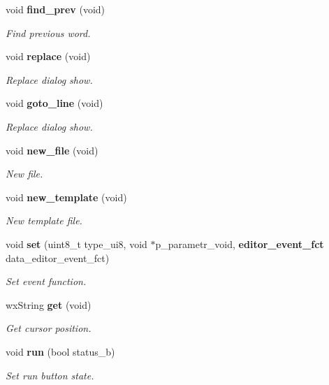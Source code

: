 \begin{DoxyCompactItemize}
void \textbf{ find\+\_\+prev} (void)
\begin{DoxyCompactList}\small\item\em Find previous word. \end{DoxyCompactList}\item 
void \textbf{ replace} (void)
\begin{DoxyCompactList}\small\item\em Replace dialog show. \end{DoxyCompactList}\item 
void \textbf{ goto\+\_\+line} (void)
\begin{DoxyCompactList}\small\item\em Replace dialog show. \end{DoxyCompactList}\item 
void \textbf{ new\+\_\+file} (void)
\begin{DoxyCompactList}\small\item\em New file. \end{DoxyCompactList}\item 
void \textbf{ new\+\_\+template} (void)
\begin{DoxyCompactList}\small\item\em New template file. \end{DoxyCompactList}\item 
void \textbf{ set} (uint8\+\_\+t type\+\_\+ui8, void $\ast$p\+\_\+parametr\+\_\+void, \textbf{ editor\+\_\+event\+\_\+fct} data\+\_\+editor\+\_\+event\+\_\+fct)
\begin{DoxyCompactList}\small\item\em Set event function. \end{DoxyCompactList}\item 
wx\+String \textbf{ get} (void)
\begin{DoxyCompactList}\small\item\em Get cursor position. \end{DoxyCompactList}\item 
void \textbf{ run} (bool status\+\_\+b)
\begin{DoxyCompactList}\small\item\em Set run button state. \end{DoxyCompactList}\end{DoxyCompactItemize}
